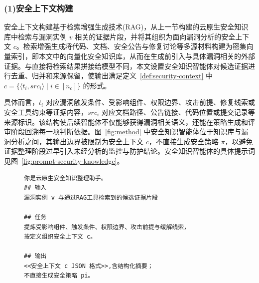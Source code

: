 \subsubsection{(1)安全上下文构建}

安全上下文构建基于检索增强生成技术(RAG)\cite{lewis2020retrieval}，从上一节构建的云原生安全知识库中检索与漏洞实例 $v$ 相关的证据片段，并将其组织为面向漏洞分析的安全上下文 $c$。检索增强生成将代码、文档、安全公告与修复讨论等多源材料构建为密集向量索引，即本文中的向量化安全知识库，从而在生成前引入与具体漏洞相关的外部证据。与直接将检索结果拼接给模型不同，本文设置安全知识智能体对候选证据进行去重、归并和来源保留，使输出满足定义~\ref{def:security-context} 中 $c=\{\langle t_i,\mathit{src}_i\rangle\mid i\in[n_c]\}$ 的形式。

具体而言，$t_i$ 对应漏洞触发条件、受影响组件、权限边界、攻击前提、修复线索或安全工具约束等证据内容，$\mathit{src}_i$ 对应文档路径、公告链接、代码位置或提交记录等来源标识。该结构使后续智能体不仅能够获得漏洞相关语义，还能在策略生成和评审阶段回溯每一项判断依据。图~\ref{fig:method} 中安全知识智能体位于知识库与漏洞分析之间，其输出边界被限制为安全上下文 $c$，不直接生成安全策略 $\pi$，以避免证据整理阶段过早引入未经分析的监控与防护结论。安全知识智能体的具体提示词见图~\ref{fig:prompt-security-knowledge}。

\begin{figure}[htb]
    
    \centering
    \setlength{\abovecaptionskip}{3pt}
    \setlength{\belowcaptionskip}{0pt}
    \begin{tcolorbox}[enhanced,colback=gray!3,colframe=gray!55,boxrule=0.4pt,arc=1mm,left=2mm,right=2mm,top=0.5mm,bottom=0.5mm,title={\small \textbf{安全知识智能体提示词简化示例}},fonttitle=\bfseries,coltitle=black]
    \begin{BVerbatim}[fontsize=\small,baselinestretch=0.8]
你是云原生安全知识整理助手。
## 输入
漏洞实例 v 与通过RAG工具检索到的候选证据片段

## 任务
提炼受影响组件、触发条件、权限边界、攻击前提与缓解线索，
按定义组织安全上下文 c。

## 输出
<<安全上下文 c JSON 格式>>,含结构化摘要；
不直接生成安全策略 pi。
    \end{BVerbatim}
    \end{tcolorbox}
    \label{fig:prompt-security-knowledge}
    \label{fig:sec_agent}
\end{figure}

